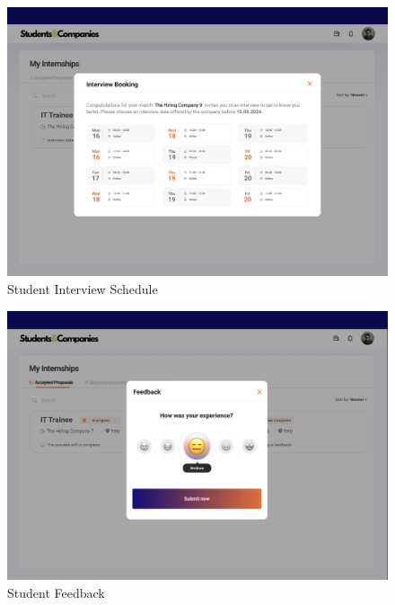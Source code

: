 \documentclass{article}
\begin{document}
\begin{figure}[H]
    \centering
    \includegraphics[scale = 0.42]{figures/UserInterfaces/Student/BookingPop-up.png}
    \caption{Student Interview Schedule}
     \centering
\end{figure}

\begin{figure}[H]
    \centering
    \includegraphics[scale = 0.42]{figures/UserInterfaces/Student/Feedback.png}
    \caption{Student Feedback}
     \centering
\end{figure}
\end{document}
